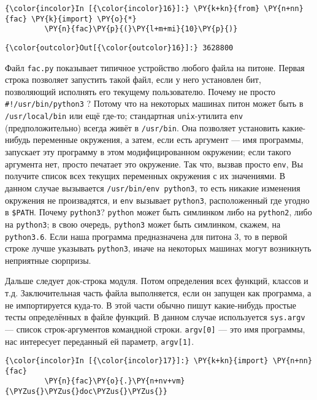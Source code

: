     \begin{Verbatim}[commandchars=\\\{\}]
{\color{incolor}In [{\color{incolor}16}]:} \PY{k+kn}{from} \PY{n+nn}{fac} \PY{k}{import} \PY{o}{*}
         \PY{n}{fac}\PY{p}{(}\PY{l+m+mi}{10}\PY{p}{)}
\end{Verbatim}

            \begin{Verbatim}[commandchars=\\\{\}]
{\color{outcolor}Out[{\color{outcolor}16}]:} 3628800
\end{Verbatim}
        
    Файл \texttt{fac.py} показывает типичное устройство любого файла на
питоне. Первая строка позволяет запустить такой файл, если у него
установлен бит, позволяющий исполнять его текущему пользователю. Почему
не просто \texttt{\#!/usr/bin/python3} ? Потому что на некоторых машинах
питон может быть в \texttt{/usr/local/bin} или ещё где-то; стандартная
\texttt{unix}-утилита \texttt{env} (предположительно) всегда живёт в
\texttt{/usr/bin}. Она позволяет установить какие-нибудь переменные
окружения, а затем, если есть аргумент --- имя программы, запускает эту
программу в этом модифицированном окружении; если такого аргумента нет,
просто печатает это окружение. Так что, вызвав просто \texttt{env}, Вы
получите список всех текущих переменных окружения с их значениями. В
данном случае вызывается \texttt{/usr/bin/env\ python3}, то есть никакие
изменения окружения не произвадятся, и \texttt{env} вызывает
\texttt{python3}, расположенный где угодно в \texttt{\$PATH}. Почему
\texttt{python3}? \texttt{python} может быть симлинком либо на
\texttt{python2}, либо на \texttt{python3}; в свою очередь,
\texttt{python3} может быть симлинком, скажем, на \texttt{python3.6}.
Если наша программа предназначена для питона 3, то в первой строке лучше
указывать \texttt{python3}, иначе на некоторых машинах могут возникнуть
неприятные сюрпризы.

Дальше следует док-строка модуля. Потом определения всех функций,
классов и т.д. Заключительная часть файла выполняется, если он запущен
как программа, а не импортируется куда-то. В этой части обычно пишут
какие-нибудь простые тесты определённых в файле функций. В данном случае
используется \texttt{sys.argv} --- список строк-аргументов командной
строки. \texttt{argv{[}0{]}} --- это имя программы, нас интересует
переданный ей параметр, \texttt{argv{[}1{]}}.

    \begin{Verbatim}[commandchars=\\\{\}]
{\color{incolor}In [{\color{incolor}17}]:} \PY{k+kn}{import} \PY{n+nn}{fac}
         \PY{n}{fac}\PY{o}{.}\PY{n+nv+vm}{\PYZus{}\PYZus{}doc\PYZus{}\PYZus{}}
\end{Verbatim}

